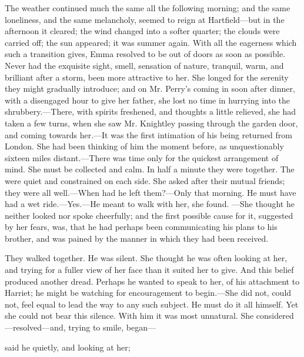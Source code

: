 The weather continued much the same all the following morning; and the same loneliness, and the same melancholy, seemed to reign at Hartfield---but in the afternoon it cleared; the wind changed into a softer quarter; the clouds were carried off; the sun appeared; it was summer again. With all the eagerness which such a transition gives, Emma resolved to be out of doors as soon as possible. Never had the exquisite sight, smell, sensation of nature, tranquil, warm, and brilliant after a storm, been more attractive to her. She longed for the serenity they might gradually introduce; and on Mr. Perry's coming in soon after dinner, with a disengaged hour to give her father, she lost no time in hurrying into the shrubbery.---There, with spirits freshened, and thoughts a little relieved, she had taken a few turns, when she saw Mr. Knightley passing through the garden door, and coming towards her.---It was the first intimation of his being returned from London. She had been thinking of him the moment before, as unquestionably sixteen miles distant.---There was time only for the quickest arrangement of mind. She must be collected and calm. In half a minute they were together. The  were quiet and constrained on each side. She asked after their mutual friends; they were all well.---When had he left them?---Only that morning. He must have had a wet ride.---Yes.---He meant to walk with her, she found. ---She thought he neither looked nor spoke cheerfully; and the first possible cause for it, suggested by her fears, was, that he had perhaps been communicating his plans to his brother, and was pained by the manner in which they had been received.

They walked together. He was silent. She thought he was often looking at her, and trying for a fuller view of her face than it suited her to give. And this belief produced another dread. Perhaps he wanted to speak to her, of his attachment to Harriet; he might be watching for encouragement to begin.---She did not, could not, feel equal to lead the way to any such subject. He must do it all himself. Yet she could not bear this silence. With him it was most unnatural. She considered---resolved---and, trying to smile, began---


 said he quietly, and looking at her; 

